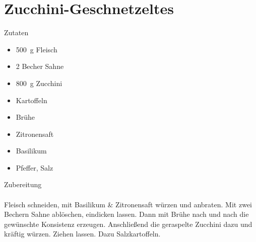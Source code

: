 \section*{Zucchini-Geschnetzeltes}
\ihead{}\ohead{}
\cfoot{}
{\Large Zutaten}
\begin{multicols}{2}
\begin{itemize}
    \item \SI{500}{g} Fleisch
    \item \num{2} Becher Sahne
    \item \SI{800}{g} Zucchini
    \item Kartoffeln
    \item Brühe
    \item Zitronensaft
    \item Basilikum
    \item Pfeffer, Salz
\end{itemize}
\end{multicols}
\noindent
{\Large Zubereitung}\\
\\
Fleisch schneiden, mit Basilikum \& Zitronensaft würzen und anbraten. 
Mit zwei Bechern Sahne ablöschen, eindicken lassen.
Dann mit Brühe nach und nach die gewünschte Konsistenz erzeugen.
Anschließend die geraspelte Zucchini dazu und kräftig würzen.
Ziehen lassen.
Dazu Salzkartoffeln.
